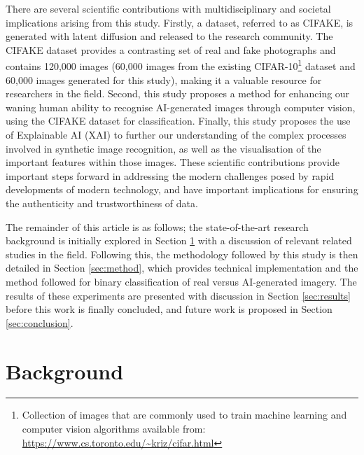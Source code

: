 \documentclass{article}
\begin{document}
There are several scientific contributions with multidisciplinary and societal implications arising from this study. Firstly, a dataset, referred to as CIFAKE, is generated with latent diffusion and released to the research community. The CIFAKE dataset provides a contrasting set of real and fake photographs and contains 120,000 images (60,000 images from the existing CIFAR-10\footnote{Collection of images that are commonly used to train machine learning and computer vision algorithms available from: \url{https://www.cs.toronto.edu/~kriz/cifar.html}} dataset and 60,000 images generated for this study), making it a valuable resource for researchers in the field. Second, this study proposes a method for enhancing our waning human ability to recognise AI-generated images through computer vision, using the CIFAKE dataset for classification. Finally, this study proposes the use of Explainable AI (XAI) to further our understanding of the complex processes involved in synthetic image recognition, as well as the visualisation of the important features within those images. These scientific contributions provide important steps forward in addressing the modern challenges posed by rapid developments of modern technology, and have important implications for ensuring the authenticity and trustworthiness of data. 

The remainder of this article is as follows; the state-of-the-art research background is initially explored in Section \ref{sec:background} with a discussion of relevant related studies in the field. Following this, the methodology followed by this study is then detailed in Section \ref{sec:method},  which provides technical implementation and the method followed for binary classification of real versus AI-generated imagery. The results of these experiments are presented with discussion in Section \ref{sec:results} before this work is finally concluded, and future work is proposed in Section \ref{sec:conclusion}.  

\section{Background}
\label{sec:background}
\end{document}
